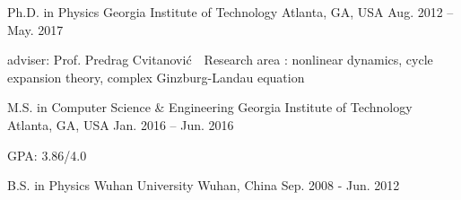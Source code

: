 


\begin{cventries}

\cveducation
{Ph.D. in Physics}
{Georgia Institute of Technology}
{Atlanta, GA, USA}
{Aug. 2012 -- May. 2017}
{
  \begin{cvitems}
    \item adviser: Prof. Predrag Cvitanovi\'c \quad \quad 
    \bullet \,\, Research area : nonlinear dynamics, cycle expansion theory,
      complex Ginzburg-Landau equation
  \end{cvitems}
}


\cveducation
{M.S. in Computer Science \& Engineering }
{Georgia Institute of Technology}
{Atlanta, GA, USA}
{Jan. 2016 -- Jun. 2016}
{
  \begin{cvitems}
  \item GPA: 3.86/4.0
  \end{cvitems}
}

\cveducation
{B.S. in Physics} %
{Wuhan University} %
{Wuhan, China} %
{Sep. 2008 - Jun. 2012} %
{    
}
\vspace{-1em}



\end{cventries}
